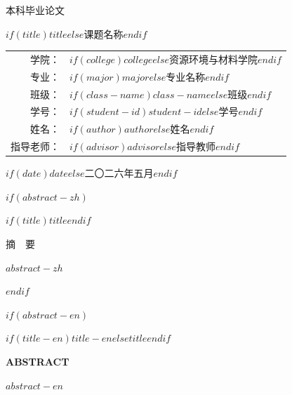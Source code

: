 \documentclass[UTF8,zihao=-4,linespread=1.0,twoside,scheme=chinese]{ctexrep}
\begin{document}
\begin{titlepage}
\centering
\vspace*{2.0cm}
{\heiti{} 本科毕业论文 \par}
\vspace{0.8cm}
{\heiti{} $if(title)$$title$$else$课题名称$endif$ \par}
\vfill
{\songti{}
\begin{tabular}{rl}
学院： & $if(college)$$college$$else$资源环境与材料学院$endif$ \\
专业： & $if(major)$$major$$else$专业名称$endif$ \\
班级： & $if(class-name)$$class-name$$else$班级$endif$ \\
学号： & $if(student-id)$$student-id$$else$学号$endif$ \\
姓名： & $if(author)$$author$$else$姓名$endif$ \\
指导老师： & $if(advisor)$$advisor$$else$指导教师$endif$ \\
\end{tabular}
\par}
\vspace{1.5cm}
{\songti{} $if(date)$$date$$else$二〇二六年五月$endif$ \par}
\end{titlepage}

\setcounter{page}{1}

$if(abstract-zh)$
\cleardoublepage
\begin{center}
{\heiti{} $if(title)$$title$$endif$ \par}
\vspace{20pt}
{\heiti{} 摘\ \ 要 \par}
\end{center}
\vspace{20pt}
$abstract-zh$

\vspace{20pt}
$endif$

$if(abstract-en)$
\cleardoublepage
\begin{center}
{\bfseries{} \MakeUppercase{$if(title-en)$$title-en$$else$$title$$endif$} \par}
\vspace{20pt}
{\bfseries{} ABSTRACT \par}
\end{center}
\vspace{20pt}
$abstract-en$
\end{document}
